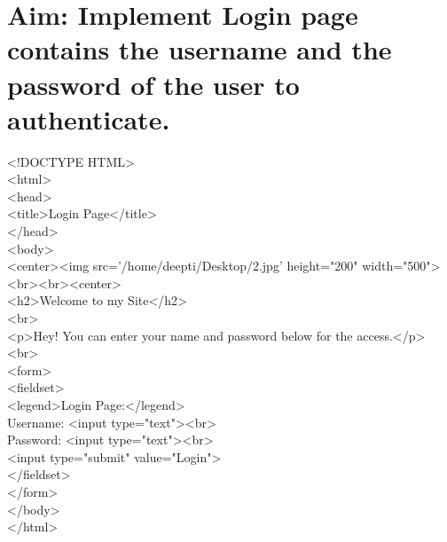 \section*{\fontsize{16}{14}\selectfont Aim: Implement Login page contains the username and the password of the user to authenticate.}
<!DOCTYPE HTML>\\
<html>\\
<head>\\
<title>Login Page</title>\\
</head> \\
<body>\\
<center><img src='/home/deepti/Desktop/2.jpg' height="200" width="500"><br><br><center>\\
<h2>Welcome to my Site</h2>\\
<br>\\
<p>Hey! You can enter your name and password below for the access.</p><br>\\
<form>\\
<fieldset>\\
<legend>Login Page:</legend>\\
Username: <input type="text"><br>\\
Password: <input type="text"><br>\\
<input type="submit" value="Login">\\
</fieldset>\\
</form> \\
</body>\\
</html>\\
